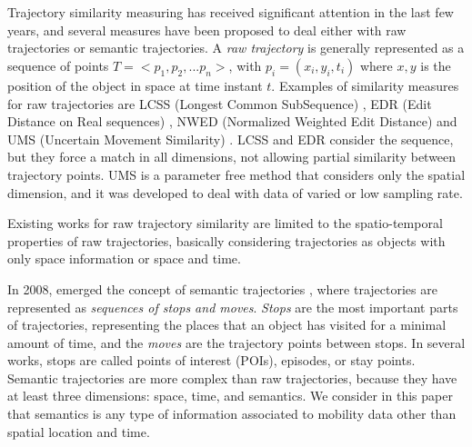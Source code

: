 \chapter{}
Trajectory similarity measuring has received significant attention in the last few years, and several measures have been proposed {to deal either with raw trajectories or semantic trajectories}. A \emph{raw trajectory} is generally represented as a sequence of points $T=<p_1, p_2, ...p_n>$, with $p_i=(x_i,y_i,t_i)$ where $x,y$ is the position of the object in space at time instant $t$.  Examples of similarity measures for raw trajectories are LCSS (Longest Common SubSequence) \cite{vlachos2002discovering}, EDR (Edit Distance on Real sequences) \cite{Chen:2005:RFS:1066157.1066213}, NWED (Normalized Weighted Edit Distance) \cite{dodge2012} and UMS (Uncertain Movement Similarity) \cite{Furtado-UMS-2018}. LCSS \cite{vlachos2002discovering} and EDR \cite{Chen:2005:RFS:1066157.1066213} consider the sequence, but they force a match in all dimensions, not allowing partial similarity between trajectory points.  
UMS \cite{Furtado-UMS-2018} is a parameter free method that considers only the spatial dimension, and it was developed to deal with data of varied or low sampling rate.


Existing works for raw trajectory similarity are limited to the spatio-temporal properties of raw trajectories, basically considering trajectories as objects with only space information or space and time.

In 2008, emerged the concept of semantic trajectories \cite{Spaccapietra:2008:CVT:1347466.1347785}, where trajectories are represented as \emph{sequences of stops and moves}. \emph{Stops} are the most important parts of trajectories, representing the places that an object has visited for a minimal amount of time, and the \emph{moves} are the trajectory points between stops. In several works, stops are called points of interest (POIs), episodes, or stay points. Semantic trajectories are more complex than raw trajectories, because they have at least three dimensions: space, time, and semantics. {We consider in this paper that semantics is any type of information associated to mobility data other than spatial location and time.}

